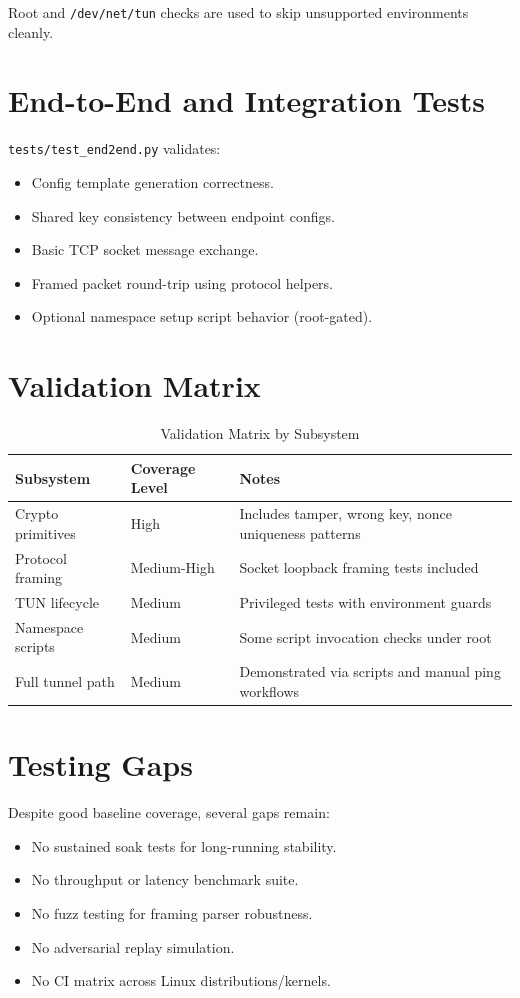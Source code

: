 Root and \texttt{/dev/net/tun} checks are used to skip unsupported environments cleanly.

\section{End-to-End and Integration Tests}
\texttt{tests/test\_end2end.py} validates:
\begin{itemize}[leftmargin=2em]
\item Config template generation correctness.
\item Shared key consistency between endpoint configs.
\item Basic TCP socket message exchange.
\item Framed packet round-trip using protocol helpers.
\item Optional namespace setup script behavior (root-gated).
\end{itemize}

\section{Validation Matrix}
\begin{table}[H]
\centering
\caption{Validation Matrix by Subsystem}
\begin{tabular}{p{}p{}p{}}
\toprule
\textbf{Subsystem} & \textbf{Coverage Level} & \textbf{Notes} \\
\midrule
Crypto primitives & High & Includes tamper, wrong key, nonce uniqueness patterns \\
Protocol framing & Medium-High & Socket loopback framing tests included \\
TUN lifecycle & Medium & Privileged tests with environment guards \\
Namespace scripts & Medium & Some script invocation checks under root \\
Full tunnel path & Medium & Demonstrated via scripts and manual ping workflows \\
\bottomrule
\end{tabular}
\end{table}

\section{Testing Gaps}
Despite good baseline coverage, several gaps remain:
\begin{itemize}[leftmargin=2em]
\item No sustained soak tests for long-running stability.
\item No throughput or latency benchmark suite.
\item No fuzz testing for framing parser robustness.
\item No adversarial replay simulation.
\item No CI matrix across Linux distributions/kernels.
\end{itemize}

